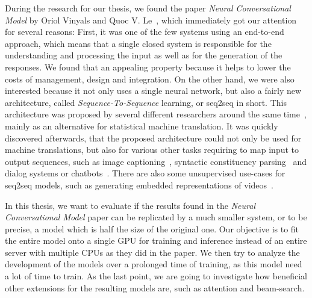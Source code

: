 During the research for our thesis, we found the paper \emph{Neural Conversational Model} by Oriol Vinyals and Quoc V. Le~\cite{Vinyals:2015}, which immediately got our attention for several reasons: First, it was one of the few systems using an end-to-end approach, which means that a single closed system is responsible for the understanding and processing the input as well as for the generation of the responses. We found that an appealing property because it helps to lower the costs of management, design and integration. On the other hand, we were also interested because it not only uses a single neural network, but also a fairly new architecture, called \emph{Sequence-To-Sequence} learning, or seq2seq in short. This architecture was proposed by several different researchers around the same time~\cite{Sutskever:2014}\cite{Kalchbrenner:2013}\cite{Cho:2014}, mainly as an alternative for statistical machine translation. It was quickly discovered afterwards, that the proposed architecture could not only be used for machine translations, but also for various other tasks requiring to map input to output sequences, such as image captioning~\cite{Xu:2015}, syntactic constituency parsing~\cite{Vinyals:2015:Foreign} and dialog systems or chatbots~\cite{Zivkovic:Trumpbot}\cite{Lison:2016}. There are also some unsupervised use-cases for seq2seq models, such as generating embedded representations of videos~\cite{Nitish:2015}.

In this thesis, we want to evaluate if the results found in the \emph{Neural Conversational Model} paper can be replicated by a much smaller system, or to be precise, a model which is half the size of the original one. Our objective is to fit the entire model onto a single GPU for training and inference instead of  an entire server with multiple CPUs as they did in the paper. We then try to analyze the development of the models over a prolonged time of training, as this model need a lot of time to train. As the last point, we are going to investigate how beneficial other extensions for the resulting models are, such as attention and beam-search.